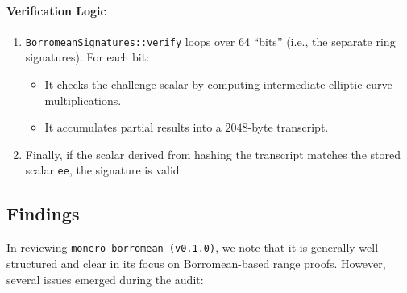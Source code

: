 \documentclass[12pt,a4paper]{article}
\begin{document}
\paragraph{Verification Logic}
\begin{enumerate}[label=(\roman*)]
  \item \texttt{BorromeanSignatures::verify} loops over 64 “bits” (i.e., the separate ring signatures). For each bit: %
  \begin{itemize}
    \item It checks the challenge scalar by computing intermediate elliptic-curve multiplications. %
    \item It accumulates partial results into a $2048$-byte transcript. %
  \end{itemize}
  \item Finally, if the scalar derived from hashing the transcript matches the stored scalar \texttt{ee}, the signature is valid %
\end{enumerate}

\subsection{Findings}

In reviewing \texttt{monero-borromean (v0.1.0)}, we note that it is generally well-structured and clear in its focus on Borromean-based range proofs. However, several issues emerged during the audit:
\end{document}
